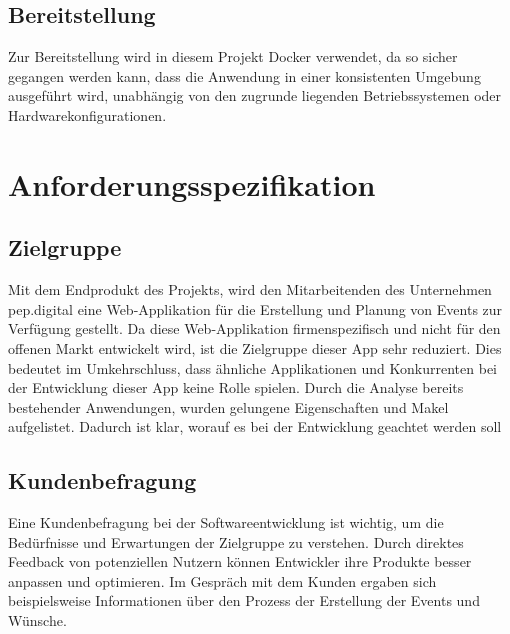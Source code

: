 \documentclass[a4paper,12pt]{article}
\begin{document}

\subsection{Bereitstellung}
Zur Bereitstellung wird in diesem Projekt \gls{Docker} verwendet, da so sicher gegangen werden kann, dass die Anwendung in einer konsistenten Umgebung ausgeführt wird, unabhängig von den zugrunde liegenden Betriebssystemen oder Hardwarekonfigurationen.

\newpage


\section{Anforderungsspezifikation}


\subsection{Zielgruppe}
Mit dem Endprodukt des Projekts, wird den Mitarbeitenden des Unternehmen pep.digital eine Web-Applikation für die Erstellung und Planung von Events zur Verfügung gestellt. Da diese Web-Applikation firmenspezifisch und  nicht für den offenen Markt entwickelt wird, ist die Zielgruppe dieser App sehr reduziert. Dies bedeutet im Umkehrschluss, dass ähnliche Applikationen und Konkurrenten bei der Entwicklung dieser App keine Rolle spielen. Durch die Analyse bereits bestehender Anwendungen, wurden gelungene Eigenschaften und Makel aufgelistet. Dadurch ist klar, worauf es bei der Entwicklung geachtet werden soll


\subsection{Kundenbefragung}
Eine Kundenbefragung bei der Softwareentwicklung ist wichtig, um die Bedürfnisse und Erwartungen der Zielgruppe zu verstehen. Durch direktes Feedback von potenziellen Nutzern können Entwickler ihre Produkte besser anpassen und optimieren. Im Gespräch mit dem Kunden ergaben sich beispielsweise Informationen über den Prozess der Erstellung der Events und Wünsche.
\end{document}
